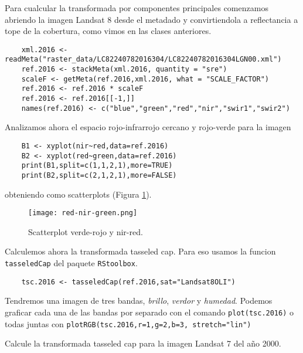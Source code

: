 \begin{exa}
    Para cualcular la transformada por componentes principales comenzamos
    abriendo la imagen Landsat 8 desde el metadado y convirtiendola a reflectancia
    a tope de la cobertura, como vimos en las clases anteriores.
    \begin{lstlisting}
    xml.2016 <- readMeta("raster_data/LC82240782016304/LC82240782016304LGN00.xml")
    ref.2016 <- stackMeta(xml.2016, quantity = "sre")
    scaleF <- getMeta(ref.2016,xml.2016, what = "SCALE_FACTOR")
    ref.2016 <- ref.2016 * scaleF
    ref.2016 <- ref.2016[[-1,]]
    names(ref.2016) <- c("blue","green","red","nir","swir1","swir2")
    \end{lstlisting}

    Analizamos ahora el espacio rojo-infrarrojo cercano y rojo-verde para la imagen

    \begin{lstlisting}
    B1 <- xyplot(nir~red,data=ref.2016)
    B2 <- xyplot(red~green,data=ref.2016)
    print(B1,split=c(1,1,2,1),more=TRUE)
    print(B2,split=c(2,1,2,1),more=FALSE)
    \end{lstlisting}

    obteniendo como scatterplots (Figura \ref{fig:green-red}).

    \begin{figure}[h!]
    \begin{center}
        \texttt{[image: red-nir-green.png]}
    \end{center}
    \caption{Scatterplot verde-rojo y nir-red.}
    \label{fig:green-red}
    \end{figure}

    Calculemos ahora la transformada tasseled cap. Para eso usamos la funcion
    \texttt{tasseledCap} del paquete \texttt{RStoolbox}.
    \begin{lstlisting}
    tsc.2016 <- tasseledCap(ref.2016,sat="Landsat8OLI")
    \end{lstlisting}
    Tendremos una imagen de tres bandas, \emph{brillo}, \emph{verdor} y
    \emph{humedad}. Podemos graficar cada una de las bandas por separado con el
    comando \texttt{plot(tsc.2016)} o todas juntas con \texttt{plotRGB(tsc.2016,r=1,g=2,b=3, stretch="lin")}
\end{exa}

\begin{act}
    Calcule la transformada tasseled cap para la imagen Landsat 7 del año 2000.
\end{act}

